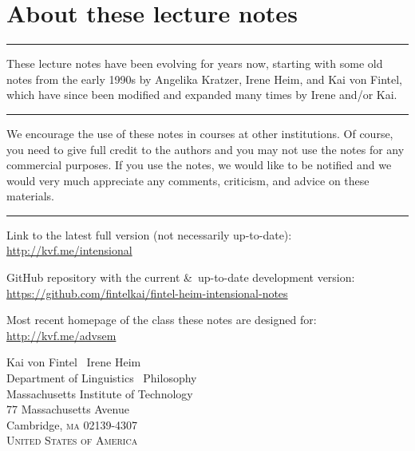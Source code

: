\frontmatter

\title{}
\author{\and{}} 
\date{\\[18pt] [last changed on \today]}

\pagestyle{empty}

\maketitle

\cleardoublepage

\section*{About these lecture notes}

\plainbreak{1} 

These lecture notes have been evolving for years now, starting with some old
notes from the early 1990s by Angelika Kratzer, Irene Heim, and Kai von Fintel,
which have since been modified and expanded many times by Irene and/or Kai.

\plainbreak{1} 

We encourage the use of these notes in courses at other institutions. Of course,
you need to give full credit to the authors and you may not use the notes for
any commercial purposes. If you use the notes, we would like to be notified and
we would very much appreciate any comments, criticism, and advice on these
materials.

\plainbreak{1}

Link to the latest full version (not necessarily up-to-date):\\[6pt]
                                             \null\hfill\url{http://kvf.me/intensional}
\medskip
                                            
\noindent GitHub repository with the current \&\ up-to-date development version:\\[6pt]
            \null\hfill\url{https://github.com/fintelkai/fintel-heim-intensional-notes}

\medskip

\noindent Most recent homepage of the class these notes are designed for:\\[6pt]
                        \null\hfill\url{http://kvf.me/advsem}

\vfill

\noindent Kai von Fintel \amp\ Irene Heim\\
Department of Linguistics \amp\ Philosophy\\
Massachusetts Institute of Technology\\
77 Massachusetts Avenue\\
Cambridge, \textsc{ma} 02139-4307\\
\textsc{United States of America} 

